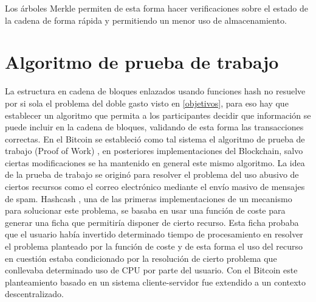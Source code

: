 Los árboles Merkle permiten de esta forma hacer verificaciones sobre el estado de la cadena de forma rápida y permitiendo un menor uso de almacenamiento.

\begin{figure}[H]
\centering
  \qquad

	\label{fig:merkle}%
\end{figure}


\section{Algoritmo de prueba de trabajo}\label{chap3:pow}
La estructura en cadena de bloques enlazados usando funciones hash no resuelve por si sola el problema del doble gasto visto en \ref{objetivos}, para eso hay que establecer un algoritmo que permita a los participantes decidir que información se puede incluir en la cadena de bloques, validando de esta forma las transacciones correctas. En el Bitcoin se estableció como tal sistema el algoritmo de prueba de trabajo (Proof of Work) \citep{bitcoin}, en posteriores implementaciones del Blockchain, salvo ciertas modificaciones se ha mantenido en general este mismo algoritmo. La idea de la prueba de trabajo se originó para resolver el problema del uso abusivo de ciertos recursos como el correo electrónico mediante el envío masivo de mensajes de spam. Hashcash \citep{hashcash}, una de las primeras implementaciones de un mecanismo para solucionar este problema, se basaba en usar una función de coste para generar una ficha que permitiría disponer de cierto recurso. Esta ficha probaba que el usuario había invertido determinado tiempo de procesamiento en resolver el problema planteado por la función de coste y de esta forma el uso del recurso en cuestión estaba condicionado por la resolución de cierto problema que conllevaba determinado uso de CPU por parte del usuario. Con el Bitcoin este planteamiento basado en un sistema cliente-servidor fue extendido a un contexto descentralizado.

